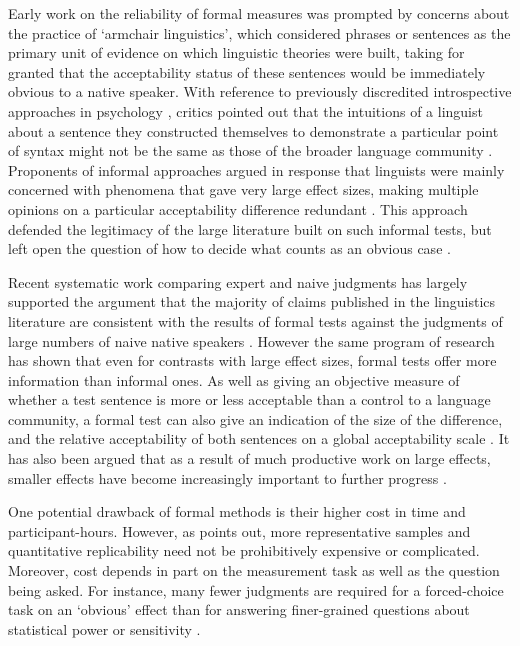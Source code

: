 \documentclass[doc]{apa6}
\begin{document}
Early work on the reliability of formal measures was prompted by concerns about the practice of `armchair linguistics', which considered phrases or sentences as the primary unit of evidence on which linguistic theories were built, taking for granted that the acceptability status of these sentences would be immediately obvious to a native speaker.
With reference to previously discredited introspective approaches in psychology \citep{danziger1980historyofintrospection}, critics pointed out that the intuitions of a linguist about a sentence they constructed themselves to demonstrate a particular point of syntax might not be the same as those of the broader language community \citep{spencer1973nonlinguistsdisagreeonhalftheitems,schutze1996empiricalbase,wasow2005intuitionsinlingargs,dabrowska2010naivevsexpert}. Proponents of informal approaches argued in response that linguists were mainly concerned with phenomena that gave very large effect sizes, making multiple opinions on a particular acceptability difference redundant \citep{phillips2003evidencereplytoedelman,phillips2009impeacharmchairlinguists,featherston2009relaxleanback}. This approach defended the legitimacy of the large literature built on such informal tests, but left open the question of how to decide what counts as an obvious case \citep{linzen2015acceptabilityreliabilitycrosslanguage}.

Recent systematic work comparing expert and naive judgments has largely supported the argument that the majority of claims published in the linguistics literature are consistent with the results of formal tests against the judgments of large numbers of naive native speakers \citep{culbertson2009linguistsbettersubjects,sprouse2012revisitingadgerscoresyntax,sprouse2013formalinformal}.
However the same program of research has shown that even for contrasts with large effect sizes, formal tests offer more information than informal ones. As well as giving an objective measure of whether a test sentence is more or less acceptable than a control to a language community, a formal test can also give an indication of the size of the difference, and the relative acceptability of both sentences on a global acceptability scale \citep{sprouse2017grammaruseofdata}. It has also been argued that as a result of much productive work on large effects, smaller effects have become increasingly important to further progress \citep{gibson2013needquantmethods,gibson2013responsetosprousealmeida}.

One potential drawback of formal methods is their higher cost in time and participant-hours. However, as \citet{myers2009smallexpdesign} points out, more representative samples and quantitative replicability need not be prohibitively expensive or complicated. Moreover, cost depends in part on the measurement task as well as the question being asked. For instance, many fewer judgments are required for a forced-choice task on an `obvious' effect \citep{mahowald2016snap} than for answering finer-grained questions about statistical power or sensitivity \citep{sprousealmeida2017sensitivitypower}.
\end{document}
